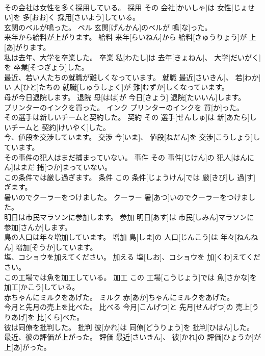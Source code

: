 \documentclass[8pt]{extreport}
\begin{document}
\begin{CJK}{UTF8}{min}
\\	その会社は女性を多く採用している。	採用	その 会社[かいしゃ]は 女性[じょせい]を 多[おお]く 採用[さいよう]している。	
\\	玄関のベルが鳴った。	ベル	玄関[げんかん]のベルが 鳴[な]った。	
\\	来年から給料が上がります。	給料	来年[らいねん]から 給料[きゅうりょう]が 上[あ]がります。	
\\	私は去年、大学を卒業した。	卒業	私[わたし]は 去年[きょねん]、 大学[だいがく]を 卒業[そつぎょう]した。	
\\	最近、若い人たちの就職が難しくなっています。	就職	最近[さいきん]、 若[わか]い 人[ひと]たちの 就職[しゅうしょく]が 難[むずか]しくなっています。	
\\	母が今日退院します。	退院	母[はは]が 今日[きょう] 退院[たいいん]します。	
\\	プリンターのインクを買った。	インク	プリンターのインクを 買[か]った。	
\\	その選手は新しいチームと契約した。	契約	その 選手[せんしゅ]は 新[あたら]しいチームと 契約[けいやく]した。	
\\	今、値段を交渉しています。	交渉	今[いま]、 値段[ねだん]を 交渉[こうしょう]しています。	
\\	その事件の犯人はまだ捕まっていない。	事件	その 事件[じけん]の 犯人[はんにん]はまだ 捕[つか]まっていない。	
\\	この条件では厳し過ぎます。	条件	この 条件[じょうけん]では 厳[きび]し 過[す]ぎます。	
\\	暑いのでクーラーをつけました。	クーラー	暑[あつ]いのでクーラーをつけました。	
\\	明日は市民マラソンに参加します。	参加	明日[あす]は 市民[しみん]マラソンに 参加[さんか]します。	
\\	島の人口は年々増加しています。	増加	島[しま]の 人口[じんこう]は 年々[ねんねん] 増加[ぞうか]しています。	
\\	塩、コショウを加えてください。	加える	塩[しお]、コショウを 加[くわ]えてください。	
\\	この工場では魚を加工している。	加工	この 工場[こうじょう]では 魚[さかな]を 加工[かこう]している。	
\\	赤ちゃんにミルクをあげた。	ミルク	赤[あか]ちゃんにミルクをあげた。	
\\	今月と先月の売上を比べた。	比べる	今月[こんげつ]と 先月[せんげつ]の 売上[うりあげ]を 比[くら]べた。	
\\	彼は同僚を批判した。	批判	彼[かれ]は 同僚[どうりょう]を 批判[ひはん]した。	
\\	最近、彼の評価が上がった。	評価	最近[さいきん]、 彼[かれ]の 評価[ひょうか]が 上[あ]がった。	

\end{CJK}
\end{document}
